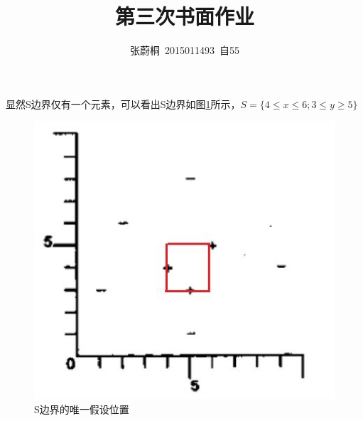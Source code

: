 \documentclass[UTF8,a4paper]{paper}
\title{第三次书面作业}
\author{张蔚桐\ 2015011493\ 自55}
\begin{document}
\maketitle
\section{}
\begin{multicols}{2}
\subsection{}
显然S边界仅有一个元素，可以看出S边界如图\ref{f1}所示，$S=\{4\le x \le 6;3 \le y \ge 5\}$
\begin{figure}[H]
\centering
\includegraphics[width=\columnwidth]{1.jpg}
\caption{S边界的唯一假设位置}
\label{f1}
\end{figure}

\end{multicols}
\end{document}
